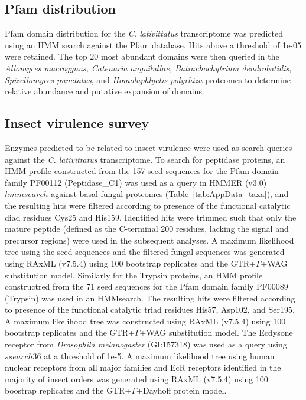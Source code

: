 \subsection*{Pfam distribution}
Pfam domain distribution for the \textit{C. lativittatus} transcriptome was predicted using an HMM search against the Pfam database. Hits above a threshold of 1e-05 were retained. The top 20 most abundant domains were then queried in the \textit{Allomyces macrogynus, Catenaria anguilullae, Batrachochytrium dendrobatidis, Spizellomyces punctatus}, and \textit{Homolaphlyctis polyrhiza} proteomes to determine relative abundance and putative expansion of domains. \\
\subsection*{Insect virulence survey}
Enzymes predicted to be related to insect virulence were used as search queries against the \textit{C. lativittatus} transcriptome. To search for peptidase proteins, an HMM profile constructed from the 157 seed sequences for the Pfam domain family PF00112 (Peptidase\_C1) was used as a query in HMMER (v3.0) $hmmsearch$ against basal fungal proteomes (Table~\ref{tab:AppData_taxa}), and the resulting hits were filtered according to presence of the functional catalytic diad residues Cys25 and His159. Identified hits were trimmed such that only the mature peptide (defined as the C-terminal 200 residues, lacking the signal and precursor regions) were used in the subsequent analyses. A maximum likelihood tree using the seed sequences and the filtered fungal sequences was generated using RAxML (v7.5.4) using 100 bootstrap replicates and the GTR+$\Gamma$+WAG substitution model. Similarly for the Trypsin proteins, an HMM profile constructred from the 71 seed sequences for the Pfam domain family PF00089 (Trypsin) was used in an HMMsearch. The resulting hits were filtered according to presence of the functional catalytic triad residues His57, Asp102, and Ser195. A maximum likelihood tree was constructed using RAxML (v7.5.4) using 100 bootstrap replicates and the GTR+$\Gamma$+WAG substitution model. The Ecdysone receptor from \textit{Drosophila melanogaster} (GI:157318) was used as a query using $ssearch36$ at a threshold of 1e-5. A maximum likelihood tree using human nuclear receptors from all major families and EcR receptors identified in the majority of insect orders was generated using RAxML (v7.5.4) \cite{Stamatakis2014} using 100 boostrap replicates and the GTR+$\Gamma$+Dayhoff protein model.\\
